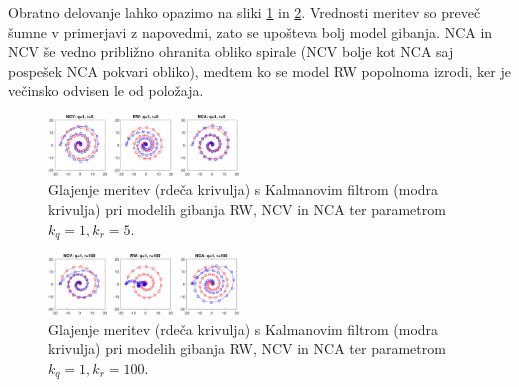 \documentclass[a4paper]{article}
\begin{document}
Obratno delovanje lahko opazimo na sliki \ref{q1r5} in \ref{q1r100}.  Vrednosti meritev so preveč šumne v primerjavi z napovedmi, zato se upošteva bolj model gibanja. NCA in NCV še vedno približno ohranita obliko spirale (NCV bolje kot NCA saj pospešek NCA pokvari obliko), medtem ko se model RW popolnoma izrodi, ker je večinsko odvisen le od položaja.
\begin{figure}[h]
	\begin{center}
		\includegraphics [width=0.45\textwidth] {q1r5.pdf}
	\end{center}
	\caption{Glajenje meritev (rdeča krivulja) s Kalmanovim filtrom (modra krivulja) pri modelih gibanja RW, NCV in NCA ter parametrom $k_q=1, k_r=5$. }
	\label{q1r5}
\end{figure}  
\begin{figure}[h]
	\begin{center}
		\includegraphics [width=0.45\textwidth] {q1r100.pdf}
	\end{center}
	\caption{Glajenje meritev (rdeča krivulja) s Kalmanovim filtrom (modra krivulja) pri modelih gibanja RW, NCV in NCA ter parametrom $k_q=1, k_r=100$. }
	\label{q1r100}
\end{figure}  
\end{document}
